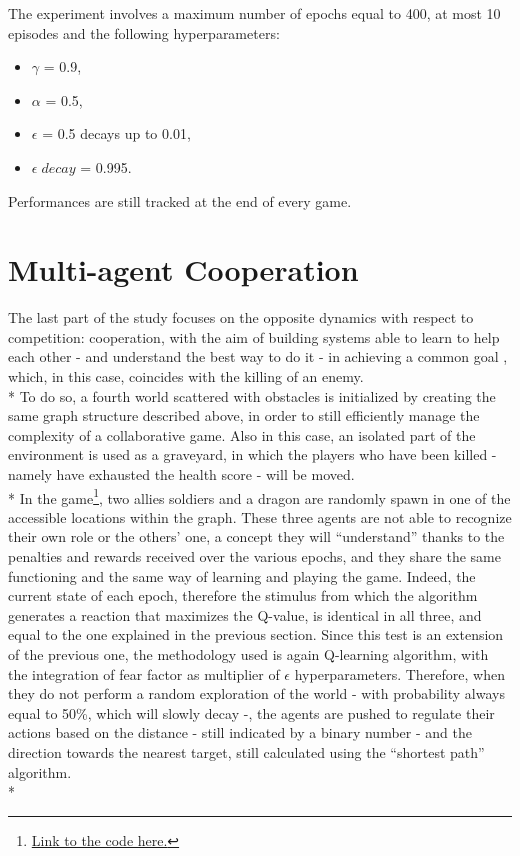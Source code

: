 The experiment involves a maximum number of epochs equal to 400,
at most 10 episodes and the following hyperparameters:
\begin{itemize}[noitemsep, topsep=0ex]
  \item $\gamma$ = 0.9,
  \item $\alpha$ = 0.5,
  \item $\epsilon$ = 0.5 decays up to 0.01,
  \item $\epsilon\;decay$ = 0.995.
\end{itemize}
Performances are still tracked at the end of every game.

\section{Multi-agent Cooperation}
The last part of the study focuses on the opposite dynamics with respect to competition: cooperation, with the aim of building systems able to learn to help each other - and understand the best way to do it - in achieving a common goal , which, in this case, coincides with the killing of an enemy.\\*
To do so, a fourth world scattered with obstacles is initialized by creating the same graph structure described above, in order to still efficiently manage the complexity of a collaborative game. Also in this case, an isolated part of the environment is used as a graveyard, in which the players who have been killed - namely have exhausted the health score - will be moved.\\*
In the game\footnote{\href{https://github.com/moiraghif/DragonHunting/tree/master/TeamWork}{Link to the code here.}}, two allies soldiers and a dragon are randomly spawn in one of the accessible locations within the graph. These three agents are not able to recognize their own role or the others' one, a concept they will ``understand'' thanks to the penalties and rewards received over the various epochs, and they share the same functioning and the same way of learning and playing the game. Indeed, the current state of each epoch, therefore the stimulus from which the algorithm generates a reaction that maximizes the Q-value, is identical in all three, and equal to the one explained in the previous section. Since this test is an extension of the previous one, the methodology used is again Q-learning algorithm, with the integration of fear factor as multiplier of $\epsilon$ hyperparameters. Therefore, when they do not perform a random exploration of the world - with probability always equal to 50\%, which will slowly decay -, the agents are pushed to regulate their actions based on the distance - still indicated by a binary number - and the direction towards the nearest target, still calculated using the ``shortest path'' algorithm.\\*
